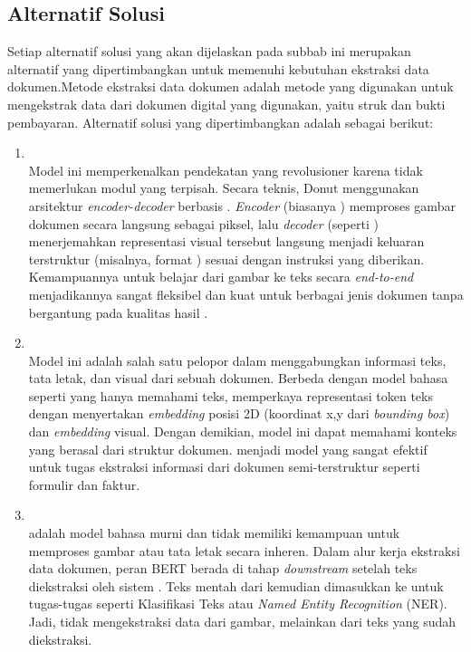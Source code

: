 \subsection{Alternatif Solusi}
\label{subsec:alternatif-solusi}
Setiap alternatif solusi yang akan dijelaskan pada subbab ini merupakan alternatif yang dipertimbangkan untuk memenuhi kebutuhan ekstraksi data dokumen.Metode ekstraksi data dokumen adalah metode yang digunakan untuk mengekstrak data dari dokumen digital yang digunakan, yaitu struk dan bukti pembayaran. Alternatif solusi yang dipertimbangkan adalah sebagai berikut:
\begin{enumerate}
    \item \donut{} ~\\ Model ini memperkenalkan pendekatan yang revolusioner karena tidak memerlukan modul \ocr{} yang terpisah. Secara teknis, Donut menggunakan arsitektur \textit{encoder-decoder} berbasis \transformer. \textit{Encoder} (biasanya \swin) memproses gambar dokumen secara langsung sebagai piksel, lalu \textit{decoder} (seperti \bart) menerjemahkan representasi visual tersebut langsung menjadi keluaran terstruktur (misalnya, format \json) sesuai dengan instruksi yang diberikan. Kemampuannya untuk belajar dari gambar ke teks secara \textit{end-to-end} menjadikannya sangat fleksibel dan kuat untuk berbagai jenis dokumen tanpa bergantung pada kualitas hasil \ocr  \parencite{kim2021donut}.

    \item \layoutlm ~\\ Model ini adalah salah satu pelopor dalam menggabungkan informasi teks, tata letak, dan visual dari sebuah dokumen. Berbeda dengan model bahasa seperti \bert{} yang hanya memahami teks, \layoutlm{} memperkaya representasi token teks dengan menyertakan \textit{embedding} posisi 2D (koordinat x,y dari \emph{bounding box}) dan \textit{embedding} visual. Dengan demikian, model ini dapat memahami konteks yang berasal dari struktur dokumen. \layoutlm{} menjadi model yang sangat efektif untuk tugas ekstraksi informasi dari dokumen semi-terstruktur seperti formulir dan faktur. \parencite{xu2020layoutlm}

    \item \bert{} ~\\
    \bert{} adalah model bahasa murni dan tidak memiliki kemampuan untuk memproses gambar atau tata letak secara inheren. Dalam alur kerja ekstraksi data dokumen, peran BERT berada di tahap \textit{downstream} setelah teks diekstraksi oleh sistem \ocr. Teks mentah dari \ocr{} kemudian dimasukkan ke \bert{} untuk tugas-tugas \nlp{} seperti Klasifikasi Teks atau \emph{Named Entity Recognition} (NER). Jadi, \bert{} tidak mengekstraksi data dari gambar, melainkan dari teks yang sudah diekstraksi. \parencite{koroteev2021bert}


\end{enumerate}
